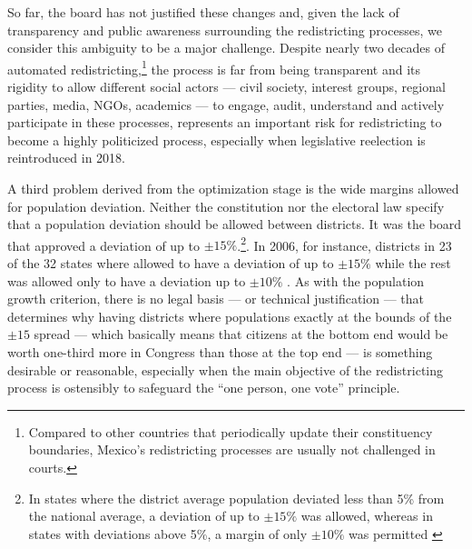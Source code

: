 \documentclass[letter,12pt]{article}
\begin{document}
So far, the board has not justified these changes and, given the lack of transparency and public awareness surrounding the redistricting processes, we consider this ambiguity to be a major challenge. Despite nearly two decades of automated redistricting,\footnote{Compared to other countries that periodically update their constituency boundaries, Mexico's redistricting processes are usually not challenged in courts.} the process is far from being transparent and its rigidity to allow different social actors --- civil society, interest groups, regional parties, media, NGOs, academics --- to engage, audit, understand and actively participate in these processes, represents an important risk for redistricting to become a highly politicized process, especially when legislative reelection is reintroduced in 2018. 


A third problem derived from the optimization stage is the wide margins allowed for population deviation. Neither the constitution nor the electoral law specify that a population deviation should be allowed between districts. It was the board that approved a deviation of up to $\pm 15\%$.\footnote{In states where the district average population deviated less than 5\% from the national average, a deviation of up to $\pm 15\%$ was allowed, whereas in states with deviations above 5\%, a margin of only $\pm 10\%$ was permitted \citep{acuerdo.ife.2004,trelles.mtz.tesisItam.2007}}. In 2006, for instance, districts in 23 of the 32 states where allowed to have a deviation of up to $\pm 15\%$ while the rest was allowed only to have a deviation up to $\pm 10\%$ \citep{trelles.mtz.tesisItam.2007}. As with the population growth criterion, there is no legal basis --- or technical justification --- that determines why having districts where populations exactly at the bounds of the $\pm15$ spread --- which basically means that citizens at the bottom end would be worth one-third more in Congress than those at the top end --- is something desirable or reasonable, especially when the main objective of the redistricting process is ostensibly to safeguard the ``one person, one vote'' principle. 
\end{document}
